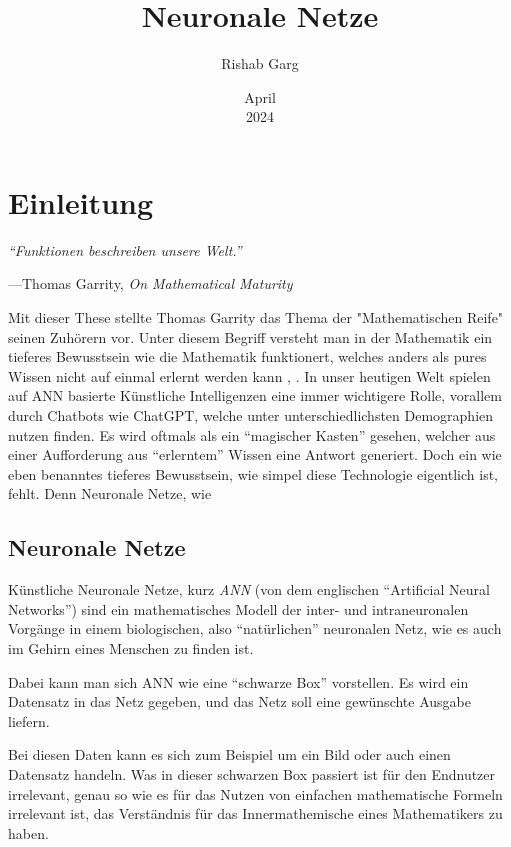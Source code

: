 \documentclass[12pt,titlepage]{article}
\title{Neuronale Netze}
\author{Rishab Garg}
\date{April \\ 2024}
\begin{document}
\maketitle


\tableofcontents
\newpage

\section{Einleitung}

\epigraph{\itshape \enquote{Funktionen beschreiben unsere Welt.}}{---Thomas Garrity, \textit{On Mathematical Maturity}}


Mit dieser These stellte Thomas Garrity das Thema der "Mathematischen Reife" seinen Zuhörern vor. Unter diesem Begriff versteht man in der Mathematik ein tieferes Bewusstsein wie die Mathematik funktionert, welches anders als pures Wissen nicht auf einmal erlernt werden kann \autocite{garrityMathematicalMaturity2017}, \autocite[99]{ralstonFutureCollegeMathematics1983}. In unser heutigen Welt spielen auf ANN basierte Künstliche Intelligenzen eine immer wichtigere Rolle, vorallem durch Chatbots wie ChatGPT, welche unter unterschiedlichsten Demographien nutzen finden. Es wird oftmals als ein \enquote{magischer Kasten} gesehen, welcher aus einer Aufforderung aus \enquote{erlerntem} Wissen eine Antwort generiert. Doch ein wie eben benanntes tieferes Bewusstsein, wie simpel diese Technologie eigentlich ist, fehlt. Denn Neuronale Netze, wie


\subsection{Neuronale Netze}

Künstliche Neuronale Netze, kurz \textit{ANN} (von dem englischen \enquote{Artificial Neural Networks}) sind ein mathematisches Modell der inter- und intraneuronalen Vorgänge in einem biologischen, also \enquote{natürlichen} neuronalen Netz, wie es auch im Gehirn eines Menschen zu finden ist.

Dabei kann man sich ANN wie eine \enquote{schwarze Box} vorstellen. Es wird ein Datensatz in das Netz gegeben, und das Netz soll eine gewünschte Ausgabe liefern.

Bei diesen Daten kann es sich zum Beispiel um ein Bild oder auch einen Datensatz handeln. Was in dieser schwarzen Box passiert ist für den Endnutzer irrelevant, genau so wie es für das Nutzen von einfachen mathematische Formeln irrelevant ist, das Verständnis für das Innermathemische eines Mathematikers zu haben.
\end{document}
